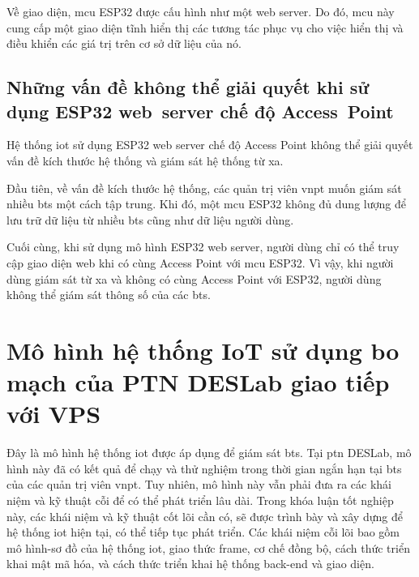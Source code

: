 Về giao diện, \acrshort{mcu} ESP32 được cấu hình như một web server. Do đó, \acrshort{mcu} này cung cấp một giao diện tĩnh hiển thị các tương tác phục vụ cho việc hiển thị và điều khiển các giá trị trên cơ sở dữ liệu của nó.

\subsection{Những vấn đề không thể giải quyết khi sử dụng ESP32 web~server chế độ Access~Point}

Hệ thống \acrshort{iot} sử dụng ESP32 web server chế độ Access Point không thể giải quyết vấn đề kích thước hệ thống và giám sát hệ thống từ xa.

Đầu tiên, về vấn đề kích thước hệ thống, các quản trị viên \acrshort{vnpt} muốn giám sát nhiều \acrshort{bts} một cách tập trung. Khi đó, một \acrshort{mcu} ESP32 không đủ dung lượng để lưu trữ dữ liệu từ nhiều \acrshort{bts} cũng như dữ liệu người dùng.

Cuối cùng, khi sử dụng mô hình ESP32 web server, người dùng chỉ có thể truy cập giao diện web khi có cùng Access Point với \acrshort{mcu} ESP32. Vì vậy, khi người dùng giám sát từ xa và không có cùng Access Point với ESP32, người dùng không thể giám sát thông số của các \acrshort{bts}.

\section{Mô hình hệ thống IoT sử dụng bo mạch của PTN DESLab giao tiếp với VPS}

Đây là mô hình hệ thống \acrshort{iot} được áp dụng để giám sát \acrshort{bts}. Tại \acrshort{ptn} DESLab, mô hình này đã có kết quả để chạy và thử nghiệm trong thời gian ngắn hạn tại \acrshort{bts} của các quản trị viên \acrshort{vnpt}. Tuy nhiên, mô hình này vẫn phải đưa ra các khái niệm và kỹ thuật cỗi để có thể phát triển lâu dài. Trong khóa luận tốt nghiệp này, các khái niệm và kỹ thuật cốt lõi cần có, sẽ được trình bày và xây dựng để hệ thống \acrshort{iot} hiện tại, có thể tiếp tục phát triển. Các khái niệm cỗi lõi bao gồm mô hình-sơ đồ của hệ thống \acrshort{iot}, giao thức frame, cơ chế đồng bộ, cách thức triển khai mật mã hóa, và cách thức triển khai hệ thống back-end và giao diện.

